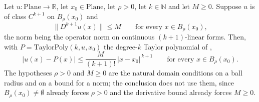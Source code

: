 \begin{lemma}
Let $u\colon\mathrm{Plane}\to\mathbb{R}$, let $x_0\in\mathrm{Plane}$, let $\rho>0$, let
$k\in\mathbb{N}$ and let $M\ge0$.  Suppose $u$ is of class $C^{k+1}$ on $B_{\rho}(x_0)$ and
\[
  \bigl\lVert D^{k+1}u(x)\bigr\rVert\le M\qquad\text{for every }x\in B_{\rho}(x_0),
\]
the norm being the operator norm on continuous $(k+1)$-linear forms.  Then, with
$P=\mathrm{TaylorPoly}(k,u,x_0)$ the degree-$k$ Taylor polynomial of ,
\[
  \bigl\lvert u(x)-P(x)\bigr\rvert
    \le\frac{M}{(k+1)!}\,\lvert x-x_0\rvert^{\,k+1}
  \qquad\text{for every }x\in B_{\rho}(x_0).
\]
The hypotheses $\rho>0$ and $M\ge0$ are the natural domain conditions on a ball radius and on a
bound for a norm; the conclusion does not use them, since $B_{\rho}(x_0)\ne\emptyset$ already
forces $\rho>0$ and the derivative bound already forces $M\ge0$.
\end{lemma}
